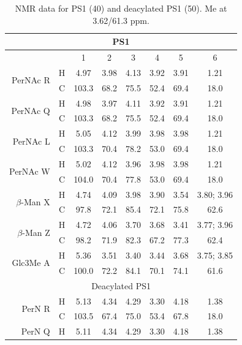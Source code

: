         \begin{table}[hp] %
          \centering
          \caption[\Ac{NMR} data for \caulobacter \ac{PS}1]{\Ac{NMR} data for \caulobacter \ac{PS}1 (40\cel) and deacylated \ac{PS}1 (50\cel). Me at 3.62/61.3 ppm.}
          \label{tbl:lpsops}
          \begin{tabular}{@{}rccccccc@{}}
            \toprule
            \multicolumn{8}{c}{PS1} \\ \midrule
         &   & 1     & 2    & 3    & 4    & 5    & 6 \\ \midrule
            \multirow{2}{*}{PerNAc R}      & H & 4.97  & 3.98 & 4.13 & 3.92 & 3.91 & 1.21 \\
         & C & 103.3 & 68.2 & 75.5 & 52.4 & 69.4 & 18.0 \\
            \multirow{2}{*}{PerNAc Q}      & H & 4.98  & 3.97 & 4.11 & 3.92 & 3.91 & 1.21 \\
         & C & 103.3 & 68.2 & 75.5 & 52.4 & 69.4 & 18.0 \\
            \multirow{2}{*}{PerNAc L}      & H & 5.05  & 4.12 & 3.99 & 3.98 & 3.98 & 1.21 \\
         & C & 103.3 & 70.4 & 78.2 & 53.0 & 69.4 & 18.0 \\
            \multirow{2}{*}{PerNAc W}      & H & 5.02  & 4.12 & 3.96 & 3.98 & 3.98 & 1.21 \\
         & C & 104.0 & 70.4 & 77.8 & 53.0 & 69.4 & 18.0 \\
            \multirow{2}{*}{$\beta$-Man X} & H & 4.74  & 4.09 & 3.98 & 3.90 & 3.54 & 3.80; 3.96 \\
         & C & 97.8  & 72.1 & 85.4 & 72.1 & 75.8 & 62.6 \\
            \multirow{2}{*}{$\beta$-Man Z} & H & 4.72  & 4.06 & 3.70 & 3.68 & 3.41 & 3.77; 3.96 \\
         & C & 98.2  & 71.9 & 82.3 & 67.2 & 77.3 & 62.4 \\
            \multirow{2}{*}{Glc3Me A}      & H & 5.36  & 3.51 & 3.40 & 3.44 & 3.68 & 3.75; 3.85 \\
         & C & 100.0 & 72.2 & 84.1 & 70.1 & 74.1 & 61.6 \\ \midrule
            \multicolumn{8}{c}{Deacylated PS1} \\ \midrule
            \multirow{2}{*}{PerN R}        & H & 5.13  & 4.34 & 4.29 & 3.30 & 4.18 & 1.38 \\
         & C & 103.5 & 67.4 & 75.0 & 53.4 & 67.8 & 18.0 \\
            \multirow{2}{*}{PerN Q}        & H & 5.11  & 4.34 & 4.29 & 3.30 & 4.18 & 1.38 \\

\end{tabular}
\end{table}
